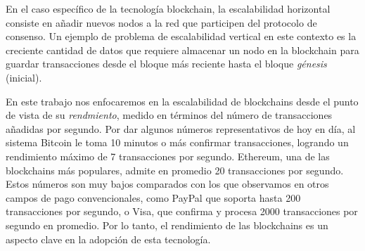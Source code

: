 En el caso específico de la tecnología blockchain, la escalabilidad horizontal consiste en añadir nuevos
nodos a la red que participen del protocolo de consenso.
%
Un ejemplo de problema de escalabilidad vertical en este contexto es la creciente cantidad de datos
que requiere almacenar un nodo en la blockchain para guardar transacciones desde el bloque más reciente
hasta el bloque \emph{génesis} (inicial).

En este trabajo nos enfocaremos en la escalabilidad de blockchains desde el punto de vista de su \emph{rendmiento}, medido
en términos del número de transacciones añadidas por segundo.
%
Por dar algunos números representativos de hoy en día, al sistema Bitcoin le toma 10 minutos o más
confirmar transacciones, logrando un rendimiento máximo de 7 transacciones por segundo.
%
Ethereum, una de las blockchains más populares, admite en promedio 20 transacciones por segundo.
%
Estos números son muy bajos comparados con los que observamos en otros campos de pago convencionales,
como PayPal que soporta hasta 200 transacciones por segundo, o Visa, que confirma y procesa 2000 transacciones
por segundo en promedio.
%
Por lo tanto, el rendimiento de las blockchains es un aspecto clave en la adopción de esta tecnología.
%




%

